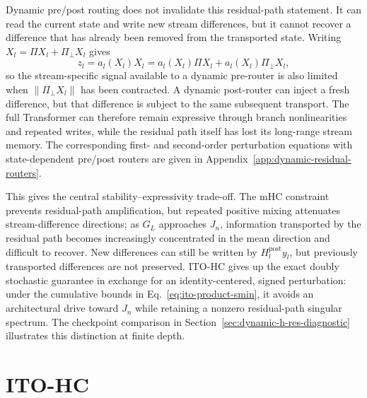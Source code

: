 \documentclass{article}
\newcommand{\Hpost}{H^{\mathrm{post}}}
\begin{document}
Dynamic pre/post routing does not invalidate this residual-path statement. It
can read the current state and write new stream differences, but it cannot recover
a difference that has already been removed from the transported state. Writing
$X_l=\Pi X_l+\Pi_\perp X_l$ gives
\begin{equation}
 z_l=a_l(X_l)X_l
 =a_l(X_l)\Pi X_l+a_l(X_l)\Pi_\perp X_l,
 \label{eq:ds-dynamic-read}
\end{equation}
so the stream-specific signal available to a dynamic pre-router is also limited
when $\|\Pi_\perp X_l\|$ has been contracted. A dynamic post-router can inject a
fresh difference, but that difference is subject to the same subsequent
transport. The full Transformer can therefore remain expressive through branch
nonlinearities and repeated writes, while the residual path itself has lost its
long-range stream memory. The corresponding first- and second-order
perturbation equations with state-dependent pre/post routers are given in
Appendix~\ref{app:dynamic-residual-routers}.

This gives the central stability--expressivity trade-off. The mHC constraint
prevents residual-path amplification, but repeated positive mixing attenuates
stream-difference directions; as $G_L$ approaches $J_n$, information transported
by the residual path becomes increasingly concentrated in the mean direction
and difficult to recover. New differences can still be written by
$\Hpost_l y_l$, but previously transported differences are not preserved.
ITO-HC gives up the exact doubly stochastic guarantee in exchange for an
identity-centered, signed perturbation: under the cumulative bounds in
Eq.~\ref{eq:ito-product-smin}, it avoids an architectural drive toward
$J_n$ while retaining a nonzero residual-path singular spectrum. The
checkpoint comparison in Section~\ref{sec:dynamic-h-res-diagnostic}
illustrates this distinction at finite depth.

\section{ITO-HC}
\end{document}
